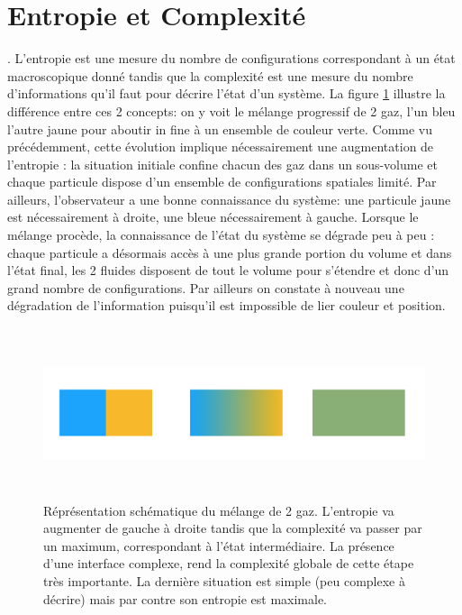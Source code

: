 \section{Entropie et Complexité}
. L'entropie est une mesure du nombre de configurations correspondant à un état macroscopique donné tandis que la complexité est une mesure du nombre d'informations qu'il faut pour décrire l'état d'un système. La figure \ref{f:melange} illustre la différence entre ces 2 concepts: on y voit le mélange progressif de 2 gaz, l'un bleu l'autre jaune pour aboutir in fine à un ensemble de couleur verte. Comme vu précédemment, cette évolution implique nécessairement une augmentation de l'entropie : la situation initiale confine chacun des gaz dans un sous-volume et chaque particule dispose d'un ensemble de configurations spatiales limité. Par ailleurs, l'observateur a une bonne connaissance du système: une particule jaune est nécessairement à droite, une bleue nécessairement à gauche. Lorsque le mélange procède, la connaissance de l'état du système se dégrade peu à peu : chaque particule a désormais accès à une plus grande portion du volume et dans l'état final, les 2 fluides disposent de tout le volume pour s'étendre et donc d'un grand nombre de configurations. Par ailleurs on constate à nouveau une dégradation de l'information puisqu'il est impossible de lier couleur et position.
\begin{figure}[htbp]
	\centering
		\includegraphics[height=5cm]{figs/melange.png}
		\caption[Entropie \& Complexité]{Réprésentation schématique du mélange de 2 gaz. L'entropie va augmenter de gauche à droite tandis que la complexité va passer par un maximum, correspondant à l'état intermédiaire. La présence d'une interface complexe, rend la complexité globale de cette étape très importante. La dernière situation est simple (peu complexe à décrire) mais par contre son entropie est maximale.}
	\label{f:melange}
\end{figure}

